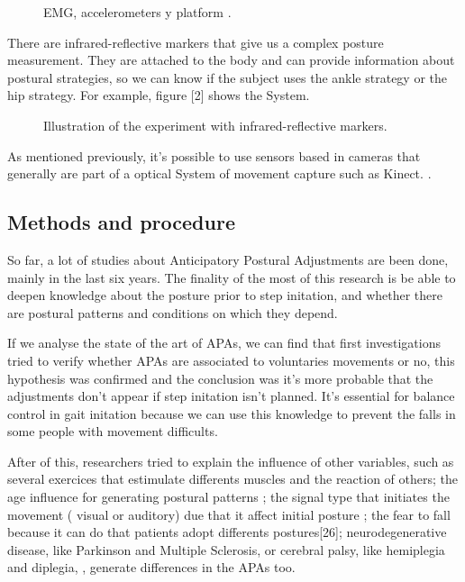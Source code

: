 \begin{figure}[H]
	\centering
	\caption{EMG, accelerometers y platform \cite{Gay2011}.}
	\label{fig:Captura}
\end{figure}

There are  infrared-reflective markers that give us a complex posture measurement. They are attached  to the body and can provide information about postural strategies, so we can know if the subject uses the ankle strategy or the hip strategy. For example, figure [2] shows the System.

\begin{figure}[H]
	\centering
	\caption{Illustration of the experiment with infrared-reflective markers\cite{Teddy2013}.}
	\label{fig:Captura2}
\end{figure}

As mentioned previously, it's possible to use sensors based in cameras that generally are part of a optical System of movement capture such  as Kinect. \cite{Instr5}.


\subsection{Methods and procedure}

So far, a lot of studies about Anticipatory Postural Adjustments are been done, mainly in the  last six years. The finality of the most of this research is be able to deepen knowledge about the posture prior to step initation, and whether there are postural patterns and conditions on which they depend.

If we analyse the state of the art of APAs, we can find that first investigations tried to verify whether APAs are associated to voluntaries movements or no,  this hypothesis was confirmed and the conclusion was it’s more probable that the adjustments don’t appear if step initation isn’t planned. It’s essential for balance control in gait initation because we can use this knowledge to prevent the falls in some people with movement difficults.\cite{Mcllroy1993}\cite{Yiou2012}\cite{Teddy2013}\cite{Bouisset2008}\cite{Neeta2014}

After of this, researchers tried to explain the influence of other variables, such as several exercices that estimulate differents muscles and the reaction of others\cite{Gay2011}; the age influence for generating postural patterns \cite{Bleuse2006} \cite{Estelle2008}; the signal type that initiates the movement ( visual or auditory) due that it affect initial posture \cite{Mcllroy1993}\cite{Antonia2009}\cite{Vicent1999}\cite{Tard2013}; the fear to fall because it can do that patients adopt differents postures[26]; neurodegenerative disease, like Parkinson and Multiple Sclerosis\cite{Mancini2009}\cite{Jebb2008}\cite{Chris2005}\cite{Hall2013}, or cerebral palsy, like hemiplegia and diplegia, \cite{Hall2013}, generate differences in the APAs too.

